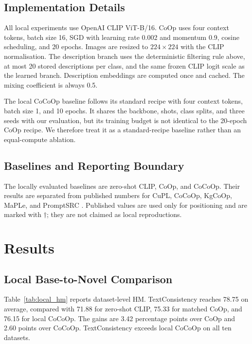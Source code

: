 \documentclass[preprint,12pt]{elsarticle}
\begin{document}
\subsection{Implementation Details}

All local experiments use OpenAI CLIP ViT-B/16. CoOp uses four context tokens, batch size 16, SGD with learning rate 0.002 and momentum 0.9, cosine scheduling, and 20 epochs. Images are resized to $224\times224$ with the CLIP normalisation. The description branch uses the deterministic filtering rule above, at most 20 stored descriptions per class, and the same frozen CLIP logit scale as the learned branch. Description embeddings are computed once and cached. The mixing coefficient is always 0.5.

The local CoCoOp baseline follows its standard recipe with four context tokens, batch size 1, and 10 epochs. It shares the backbone, shots, class splits, and three seeds with our evaluation, but its training budget is not identical to the 20-epoch CoOp recipe. We therefore treat it as a standard-recipe baseline rather than an equal-compute ablation.

\subsection{Baselines and Reporting Boundary}

The locally evaluated baselines are zero-shot CLIP, CoOp, and CoCoOp. Their results are separated from published numbers for CuPL, CoCoOp, KgCoOp, MaPLe, and PromptSRC \cite{pratt2023cupl,zhou2022cocoop,yao2023kgcoop,khattak2023maple,khattak2023promptsrc}. Published values are used only for positioning and are marked with $\dagger$; they are not claimed as local reproductions.

\section{Results}
\label{sec:results}

\subsection{Local Base-to-Novel Comparison}




Table~\ref{tab:local_hm} reports dataset-level HM. TextConsistency reaches 78.75 on average, compared with 71.88 for zero-shot CLIP, 75.33 for matched CoOp, and 76.15 for local CoCoOp. The gains are 3.42 percentage points over CoOp and 2.60 points over CoCoOp. TextConsistency exceeds local CoCoOp on all ten datasets.
\end{document}
